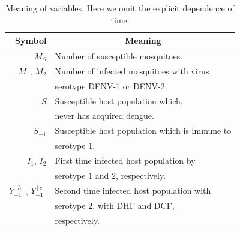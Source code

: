 \begin{table}[h!]
	\begin{center}
		\begin{tabular}{rl}
			\toprule
			Symbol		&	\multicolumn{1}{c}{Meaning}
			\\
			\midrule
			$M_S$
				& Number of susceptible mosquitoes.
			\\
			$M_1$, $M_2$
				&
				 Number of infected mosquitoes with virus
				\\
				&
				serotype \ac{DENV-1} or \ac{DENV-2}.
			\\
			$S$
				&
				Susceptible host population which,
				\\
				& never has acquired dengue.
			\\
			$S_{-1}$
			&
				Susceptible host population
				which is immune to
			\\
			&
				serotype $1$.
			\\
			$I_1$, $I_2$
			&
				First time infected host population by
			\\
				& serotype $1$ and $2$, respectively.
			\\
				$Y_{-1}^{[h]}$,
				$Y_{-1}^{[c]}$
				&
				Second time infected host population with
				\\
				&
				serotype 2, with \ac{DHF} and \ac{DCF},
                \\
                &
                respectively.
			\\
		\bottomrule
		\end{tabular}
	\end{center}
	\caption{
		Meaning of variables.
		Here we omit the explicit dependence of
		time.
	}\label{tbl:variable_description}
\end{table}
